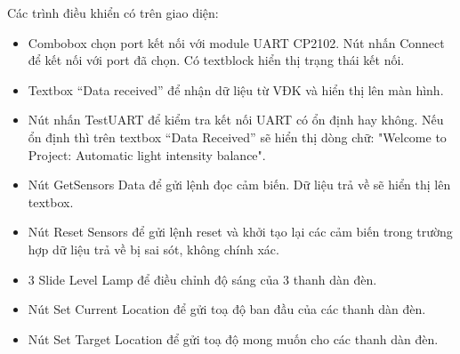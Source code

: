Các trình điều khiển có trên giao diện:
\begin{itemize}
\item Combobox chọn port kết nối với module UART CP2102. Nút nhấn Connect để kết nối với port đã chọn. Có textblock hiển thị trạng thái kết nối.
\item Textbox “Data received” để nhận dữ liệu từ VĐK và hiển thị lên màn hình.
\item Nút nhấn TestUART để kiểm tra kết nối UART có ổn định hay không. Nếu ổn định thì trên textbox “Data Received” sẽ hiển thị dòng chữ: "Welcome to Project: Automatic light intensity balance".
\item Nút GetSensors Data để gửi lệnh đọc cảm biến. Dữ liệu trả về sẽ hiển thị lên textbox.
\item Nút Reset Sensors để gửi lệnh reset và khởi tạo lại các cảm biến trong trường hợp dữ liệu trả về bị sai sót, không chính xác.
\item 3 Slide Level Lamp để điều chỉnh độ sáng của 3 thanh dàn đèn.
\item Nút Set Current Location để gửi toạ độ ban đầu của các thanh dàn đèn.
\item Nút Set Target Location để gửi toạ độ mong muốn cho các thanh dàn đèn. 
\end{itemize}
